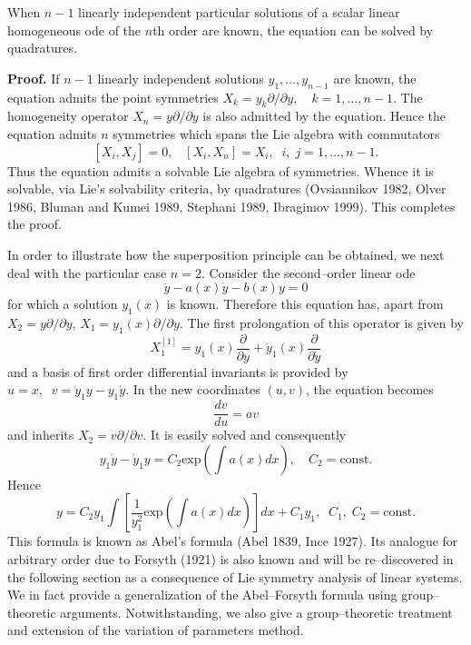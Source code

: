 \begin{theo}
\label{ch4:theo1}
\begin{em}
When $n-1$ linearly independent particular solutions of a scalar linear 
homogeneous ode of the $n$th order are known, the equation  can
be solved by quadratures.
\end{em}
\end{theo}
{\bf Proof.}  If $n-1$ linearly independent solutions $y_1,\ldots,y_{n-1}$
are known, the equation admits the point symmetries
$ X_k=y_k\partial/\partial y,\quad k=1,\ldots,n-1.$ 
The homogeneity operator $X_n=y\partial/\partial y$
is also admitted by the equation. Hence the equation admits $n$ symmetries
which spans the Lie algebra with commutators
\[ [X_i, X_j]=0,\;\;\;[X_i,X_n]=X_i,\;\; i,\;j=1,\ldots,n-1.\] 
Thus the equation admits a solvable Lie algebra of symmetries.
Whence it is solvable, via Lie's solvability criteria, by quadratures 
(Ovsiannikov 1982, Olver 1986, Bluman and Kumei 1989,
Stephani 1989, Ibragimov 1999). This completes the proof. 

In order to illustrate how the superposition principle can be obtained, we
next deal with the particular case $n=2.$ Consider the second--order linear 
ode
\[\ddot y-a(x)\dot y-b(x)y=0\]
for which a solution $y_1(x)$ is known. Therefore this  equation has,
apart from $X_2=y\partial/\partial y$, $X_1=y_1(x)\partial/\partial y$.
The first prolongation of this operator is given by 
\[X_1^{[1]}=y_1(x)\frac{\partial}{\partial y}+
\dot y_1(x)\frac{\partial}{\partial\dot y}\]
and a basis of first order differential invariants is provided by
$u=x,\;\;v=\dot y_1y-y_1\dot y.$ In the new coordinates $(u,v)$,
the equation becomes
\[\frac{dv}{du}=av\]
and inherits $X_2=v\partial/\partial v.$ It is easily solved and
consequently
\[y_1\dot y-\dot y_1 y=C_2\mbox{exp}\left (\int a(x)dx\right ),\quad
C_2=\mbox{const.}\]
Hence
\[y=C_2y_1\int \left [\frac{1}{y_1^2}\mbox{exp}\left 
(\int a(x)dx \right) \right ]dx+C_1y_1,\;\;C_1,\;C_2=\mbox{const.}\]
This formula is known as Abel's formula (Abel 1839, Ince 1927). 
Its analogue for arbitrary order due to Forsyth (1921) is also known
and will be re--discovered in the following section
as a consequence of Lie symmetry analysis of linear systems. We in fact
provide a generalization of the Abel--Forsyth formula using group--theoretic
arguments. Notwithstanding, we also give a group--theoretic treatment and
extension of the variation of parameters method.
